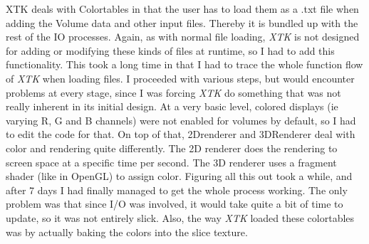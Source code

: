 \documentclass[a4paper,11pt,twoside]{article}
\begin{document}
XTK deals with Colortables in that the user has to load them as a .txt file when adding the Volume data and other input files. Thereby it is bundled up with the rest of the IO processes. Again, as with normal file loading, \textit{XTK} is not designed for adding or modifying these kinds of files at runtime, so I had to add this functionality. This took a long time in that I had to trace the whole function flow of \textit{XTK} when loading files. I proceeded with various steps, but would encounter problems at every stage, since I was forcing \textit{XTK} do something that was not really inherent in its initial design. At a very basic level, colored displays (ie varying R, G and B channels) were not enabled for volumes by default, so I had to edit the code for that. On top of that, 2Drenderer and 3DRenderer deal with color and rendering quite differently. The 2D renderer does the rendering to screen space at a specific time per second. The 3D renderer uses a fragment shader (like in OpenGL) to assign color. Figuring all this out took a while, and after 7 days I had finally managed to get the whole process working. The only problem was that since I/O was involved, it would take quite a bit of time to update, so it was not entirely slick. Also, the way \textit{XTK} loaded these colortables was by actually baking the colors into the slice texture. 
\end{document}
